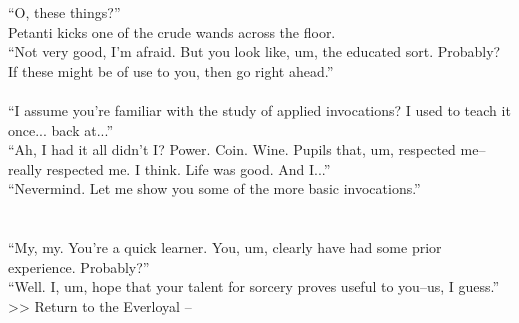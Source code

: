 “O, these things?”\\

Petanti kicks one of the crude wands across the floor.\\
“Not very good, I’m afraid. But you look like, um, the educated sort. Probably? If these might be of use to you, then go right ahead.”\\
\\

“I assume you’re familiar with the study of applied invocations? I used to teach it once... back at...”\\

“Ah, I had it all didn’t I? Power. Coin. Wine. Pupils that, um, respected me--really respected me. I think. Life was good. And I...”\\

“Nevermind. Let me show you some of the more basic invocations.”\\
\\
\\

“My, my. You’re a quick learner. You, um, clearly have had some prior experience. Probably?”\\

“Well. I, um, hope that your talent for sorcery proves useful to you--us, I guess.”\\

>> Return to the Everloyal -- 